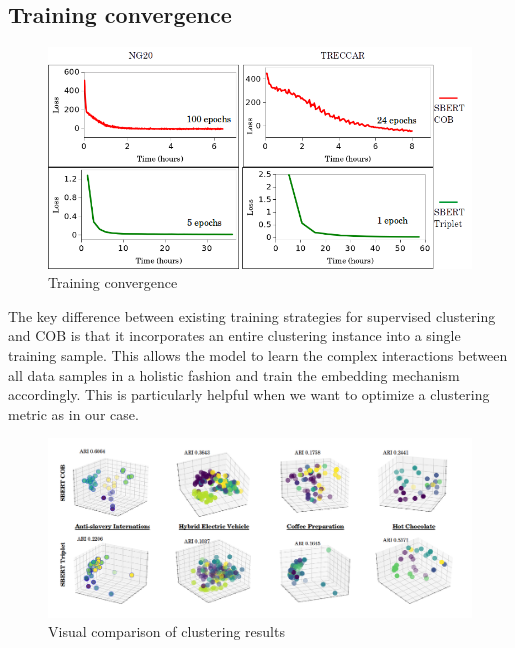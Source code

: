 \documentclass[11pt,a4paper]{article}
\begin{document}
\subsection{Training convergence} 
\begin{figure}[t]
    \centering
    \includegraphics[scale=0.75]{acl-ijcnlp2021-templates/training_loss.png}
    \caption{Training convergence}
    \label{fig:train}
\end{figure}

The key difference between existing training strategies for supervised clustering and COB is that it incorporates an entire clustering instance into a single training sample. This allows the model to learn the complex interactions between all data samples in a holistic fashion and train the embedding mechanism accordingly. This is particularly helpful when we want to optimize a clustering metric as in our case. 
\begin{figure}[h]
    \centering
    \includegraphics[scale=0.45]{acl-ijcnlp2021-templates/compare_cluster_viz.png}
    \caption{Visual comparison of clustering results}
    \label{fig:viz}
\end{figure}
\end{document}
